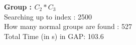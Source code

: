 \textbf{Group : $C_2*C_3$}\\
Searching up to index : 2500\\
How many normal groups are found : 527\\
Total Time (in s) in GAP: 103.6\\
